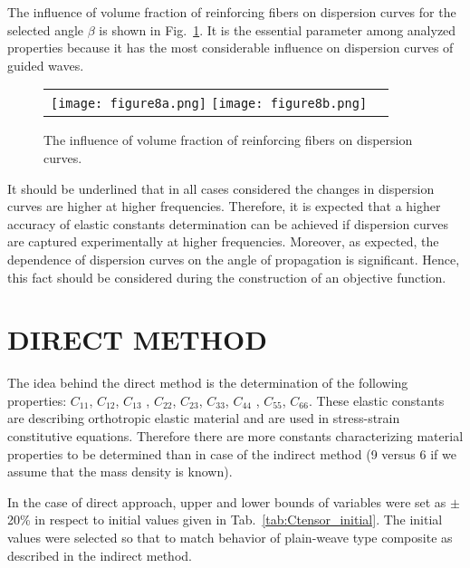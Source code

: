 \documentclass[]{spie}  %
\newcommand{\myfigscale}{0.9}
\begin{document}
The influence of volume fraction of reinforcing fibers on dispersion curves for the selected angle \(\beta\) is shown in Fig.~\ref{fig:vol}. 
It is the essential parameter among analyzed properties because it has the most considerable influence on dispersion curves of guided waves.
\begin{figure} [ht]
	\begin{center}
		\begin{tabular}{cc} %
			\texttt{[image: figure8a.png]}
			\texttt{[image: figure8b.png]}
		\end{tabular}
	\end{center}
	\caption[] 
	{ \label{fig:vol} 
		The influence of volume fraction of reinforcing fibers on dispersion curves.}
\end{figure} 

It should be underlined that in all cases considered the changes in dispersion curves are higher at higher frequencies. 
Therefore, it is expected that a higher accuracy of elastic constants determination can be achieved if dispersion curves are captured experimentally at higher frequencies. Moreover, as expected, the dependence of dispersion curves on the angle of propagation is significant. 
Hence, this fact should be considered during the construction of an objective function.

\section{DIRECT METHOD}
\label{sec:direct}

The idea behind the direct method is the determination of the following properties:
\(C_{11}\), \(C_{12}\), \(C_{13}\) , \(C_{22}\), \(C_{23}\), \(C_{33}\), \(C_{44}\) , \(C_{55}\), \(C_{66}\). These elastic constants are describing orthotropic elastic material and are used in stress-strain constitutive equations. 
Therefore there are more constants characterizing material properties to be determined than in case of the indirect method (9 versus 6 if we assume that the mass density is known).

In the case of direct approach, upper and lower bounds of variables were set as  
\(\pm\)20\% in respect to initial values given in Tab.~\ref{tab:Ctensor_initial}. 
The initial values were selected so that to match behavior of plain-weave type composite as described in the indirect method.
\end{document}
